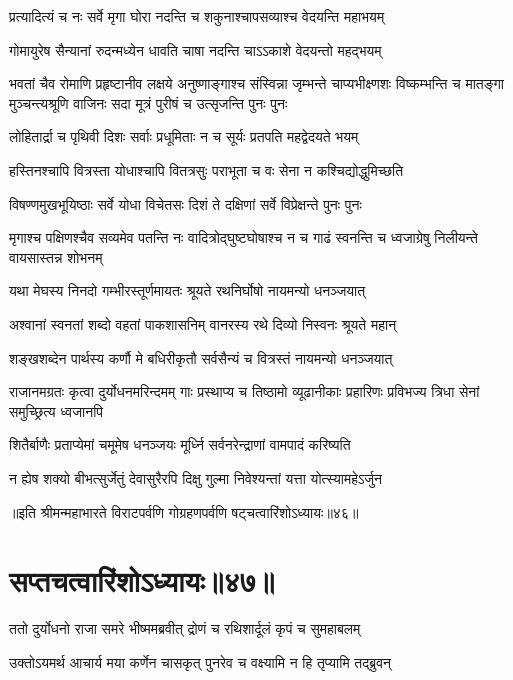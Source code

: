 \twolineshloka
{प्रत्यादित्यं च नः सर्वे मृगा घोरा नदन्ति च}
{शकुनाश्चापसव्याश्च वेदयन्ति महाभयम्}


\twolineshloka
{गोमायुरेष सैन्यानां रुदन्मध्येन धावति}
{चाषा नदन्ति चाऽऽकाशे वेदयन्तो महद्भयम्}


\onelineshloka
{भवतां चैव रोमाणि प्रहृष्टानीव लक्षये}
\threelineshloka
{अनुष्णाङ्गाश्च संस्विन्ना जृम्भन्ते चाप्यभीक्ष्णशः}
{विष्कम्भन्ति च मातङ्गा मुञ्चन्त्यश्रूणि वाजिनः}
{सदा मूत्रं पुरीषं च उत्सृजन्ति पुनः पुनः}


\twolineshloka
{लोहितार्द्रा च पृथिवी दिशः सर्वाः प्रधूमिताः}
{न च सूर्यः प्रतपति महद्वेदयते भयम्}


\twolineshloka
{हस्तिनश्चापि वित्रस्ता योधाश्चापि वितत्रसुः}
{पराभूता च वः सेना न कश्चिद्योद्धुमिच्छति}


\twolineshloka
{विषण्णमुखभूयिष्ठाः सर्वे योधा विचेतसः}
{दिशं ते दक्षिणां सर्वे विप्रेक्षन्ते पुनः पुनः}


\threelineshloka
{मृगाश्च पक्षिणश्चैव सव्यमेव पतन्ति नः}
{वादित्रोद्घुष्टघोषाश्च न च गाढं स्वनन्ति च}
{ध्वजाग्रेषु निलीयन्ते वायसास्तन्न शोभनम्}


\twolineshloka
{यथा मेघस्य निनदो गम्भीरस्तूर्णमायतः}
{श्रूयते रथनिर्घोषो नायमन्यो धनञ्जयात्}


\twolineshloka
{अश्वानां स्वनतां शब्दो वहतां पाकशासनिम्}
{वानरस्य रथे दिव्यो निस्वनः श्रूयते महान्}


\twolineshloka
{शङ्खशब्देन पार्थस्य कर्णौ मे बधिरीकृतौ}
{सर्वसैन्यं च वित्रस्तं नायमन्यो धनञ्जयात्}


\threelineshloka
{राजानमग्रतः कृत्वा दुर्योधनमरिन्दमम्}
{गाः प्रस्थाप्य च तिष्ठामो व्यूढानीकाः प्रहारिणः}
{प्रविभज्य त्रिधा सेनां समुच्छ्रित्य ध्वजानपि}


\twolineshloka
{शितैर्बाणैः प्रताप्येमां चमूमेष धनञ्जयः}
{मूर्ध्नि सर्वनरेन्द्राणां वामपादं करिष्यति}


\twolineshloka
{न ह्येष शक्यो बीभत्सुर्जेतुं देवासुरैरपि}
{दिक्षु गुल्मा निवेश्यन्तां यत्ता योत्स्यामहेऽर्जुन}

॥इति श्रीमन्महाभारते विराटपर्वणि गोग्रहणपर्वणि षट्चत्वारिंशोऽध्यायः॥४६॥

\chapter{सप्तचत्वारिंशोऽध्यायः॥४७॥}

\twolineshloka
{ततो दुर्योधनो राजा समरे भीष्ममब्रवीत्}
{द्रोणं च रथिशार्दूलं कृपं च सुमहाबलम्}


\twolineshloka
{उक्तोऽयमर्थ आचार्य मया कर्णेन चासकृत्}
{पुनरेव च वक्ष्यामि न हि तृप्यामि तद्ब्रुवन्}


